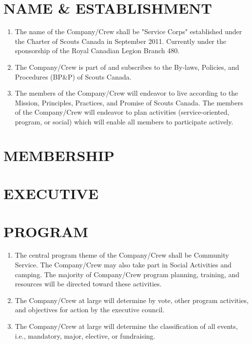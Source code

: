 \documentclass{Service_Corps_Document}
\begin{document}
    \def \Title {Constitution}
    \def \Company {Service Corps}
    \def \versionNumber {5.0}
    \stdFooter
    \begin{titlepage}
        \stdTitlePage
    \end{titlepage}

    \tableofcontents

    \newpage


    \section{NAME \& ESTABLISHMENT}
    \begin{enumerate}
        \item The name of the Company/Crew shall be "Service Corps" established under the Charter of Scouts Canada in September 2011.
        Currently under the sponsorship of the Royal Canadian Legion Branch 480.
        \item The Company/Crew is part of and subscribes to the By-laws, Policies, and Procedures (BP\&P) of Scouts Canada.
        \item The members of the Company/Crew will endeavor to live according to the Mission, Principles, Practices, and Promise of Scouts Canada.
        The members of the Company/Crew will endeavor to plan activities (service-oriented, program, or social) which will enable all members to participate actively.
    \end{enumerate}


    \section{MEMBERSHIP}
    


    \section{EXECUTIVE}
    


    \section{PROGRAM}
    \begin{enumerate}
        \item The central program theme of the Company/Crew shall be Community Service.
        The Company/Crew may also take part in Social Activities and camping.
        The majority of Company/Crew program planning, training, and resources will be directed toward these activities.
        \item The Company/Crew at large will determine by vote, other program activities, and objectives for action by the executive council.
        \item The Company/Crew at large will determine the classification of all events, i.e., mandatory, major, elective, or fundraising.
    \end{enumerate}
\end{document}

